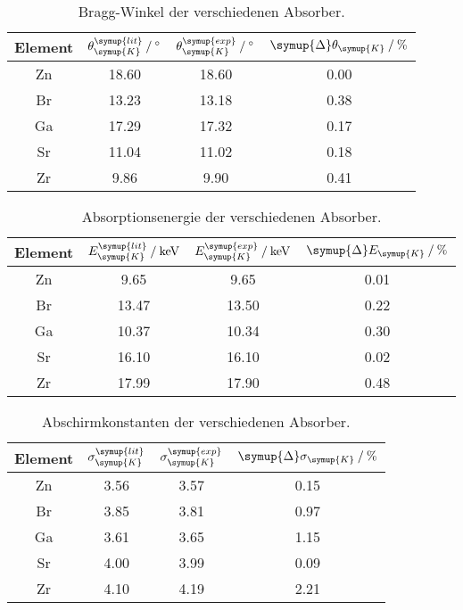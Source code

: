\begin{table}[H]
  \centering
  \caption{Bragg-Winkel der verschiedenen Absorber.}
  \label{tab:theta_K}
  \begin{tabular}{c S S S}
    \toprule
    {Element} & {$\theta_{\symup{K}}^{\symup{lit}} \mathbin{/} \unit{\degree}$} & %
    {$\theta_{\symup{K}}^{\symup{exp}}  \mathbin{/} \unit{\degree}$} & %
    {$\symup{\Delta}\theta_{\symup{K}} \mathbin{/} \unit{\percent}$}\\
    \midrule
    Zn & 18.60 & 18.60 & 0.00 \\
    Br & 13.23 & 13.18 & 0.38 \\
    Ga & 17.29 & 17.32 & 0.17 \\
    Sr & 11.04 & 11.02 & 0.18 \\
    Zr &  9.86 &  9.90 & 0.41 \\
    \bottomrule
  \end{tabular}
\end{table}

\begin{table}[H]
  \centering
  \caption{Absorptionsenergie der verschiedenen Absorber.}
  \label{tab:E_K}
  \begin{tabular}{c S S S}
    \toprule
    {Element} & {$E_{\symup{K}}^{\symup{lit}} \mathbin{/} \unit{\kilo\electronvolt}$} & %
    {$E_{\symup{K}}^{\symup{exp}}  \mathbin{/} \unit{\kilo\electronvolt}$} & %
    {$\symup{\Delta}E_{\symup{K}} \mathbin{/} \unit{\percent}$}\\
    \midrule
    Zn &  9.65 &  9.65 & 0.01 \\
    Br & 13.47 & 13.50 & 0.22 \\
    Ga & 10.37 & 10.34 & 0.30 \\
    Sr & 16.10 & 16.10 & 0.02 \\
    Zr & 17.99 & 17.90 & 0.48 \\
    \bottomrule
  \end{tabular}
\end{table}

\begin{table}[H]
  \centering
  \caption{Abschirmkonstanten der verschiedenen Absorber.}
  \label{tab:sigma_K}
  \begin{tabular}{c S S S}
    \toprule
    {Element} & {$\sigma_{\symup{K}}^{\symup{lit}}$} & %
    {$\sigma_{\symup{K}}^{\symup{exp}}$} & %
    {$\symup{\Delta}\sigma_{\symup{K}} \mathbin{/} \unit{\percent}$}\\
    \midrule
    Zn & 3.56 & 3.57 & 0.15 \\
    Br & 3.85 & 3.81 & 0.97 \\
    Ga & 3.61 & 3.65 & 1.15 \\
    Sr & 4.00 & 3.99 & 0.09 \\
    Zr & 4.10 & 4.19 & 2.21 \\
    \bottomrule
  \end{tabular}
\end{table}

